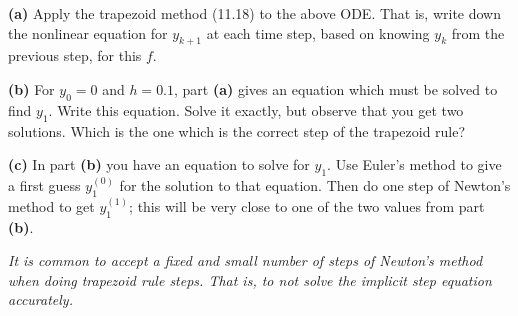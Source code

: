 \documentclass[12pt]{amsart}
\newcommand{\epart}[1]{\medskip\noindent\textbf{(#1)}\quad }
\begin{document}
\epart{a} Apply the trapezoid method (11.18) to the above ODE.  That is, write down the nonlinear equation for $y_{k+1}$ at each time step, based on knowing $y_k$ from the previous step, for this $f$.

\epart{b} For $y_0=0$ and $h=0.1$, part \textbf{(a)} gives an equation which must be solved to find $y_1$.  Write this equation.  Solve it exactly, but observe that you get two solutions.  Which is the one which is the correct step of the trapezoid rule?

\epart{c} In part \textbf{(b)} you have an equation to solve for $y_1$.  Use Euler's method to give a first guess $y_1^{(0)}$ for the solution to that equation.  Then do one step of Newton's method to get $y_1^{(1)}$; this will be very close to one of the two values from part \textbf{(b)}.

\medskip
\noindent \emph{It is common to accept a fixed and small number of steps of Newton's method when doing trapezoid rule steps.  That is, to not solve the implicit step equation accurately.}
\end{document}
